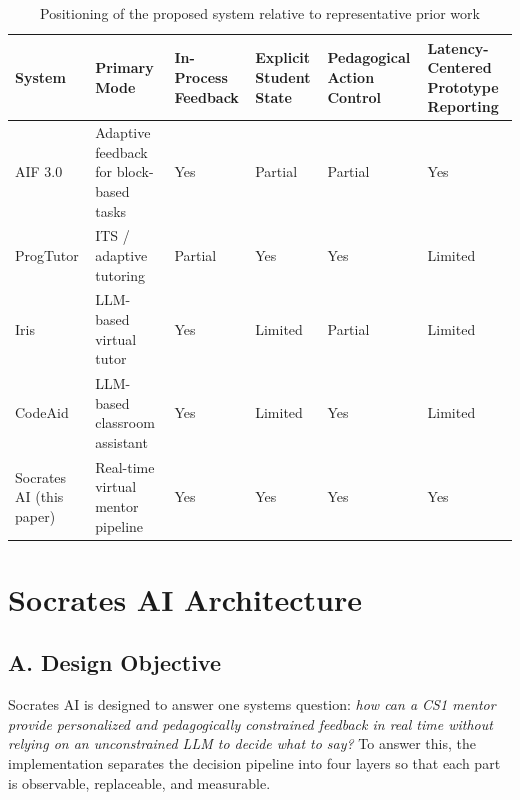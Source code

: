 ﻿\documentclass[conference]{IEEEtran}
\newcommand{\system}{Socrates AI}
\begin{document}
\begin{table}[t]
\centering
\caption{Positioning of the proposed system relative to representative prior work}
\label{tab:positioning}
\renewcommand{\arraystretch}{1.15}
\begin{tabular}{p{2.7cm} p{2.3cm} p{2.2cm} p{2.8cm} p{2.7cm} p{2.6cm}}
\hline
\textbf{System} & \textbf{Primary Mode} & \textbf{In-Process Feedback} & \textbf{Explicit Student State} & \textbf{Pedagogical Action Control} & \textbf{Latency-Centered Prototype Reporting}\\
\hline
AIF 3.0 \cite{AdaptiveImmediateFeedbackforBlockBasedProgramming} & Adaptive feedback for block-based tasks & Yes & Partial & Partial & Yes\\
ProgTutor \cite{ProgTutor} & ITS / adaptive tutoring & Partial & Yes & Yes & Limited\\
Iris \cite{IRIS} & LLM-based virtual tutor & Yes & Limited & Partial & Limited\\
CodeAid \cite{CodeAid} & LLM-based classroom assistant & Yes & Limited & Yes & Limited\\
\system{} (this paper) & Real-time virtual mentor pipeline & Yes & Yes & Yes & Yes\\
\hline
\end{tabular}
\end{table}

\section{\system{} Architecture}

\subsection*{A. Design Objective}

\system{} is designed to answer one systems question: \emph{how can a CS1 mentor provide personalized and pedagogically constrained feedback in real time without relying on an unconstrained LLM to decide what to say?} To answer this, the implementation separates the decision pipeline into four layers so that each part is observable, replaceable, and measurable.
\end{document}
